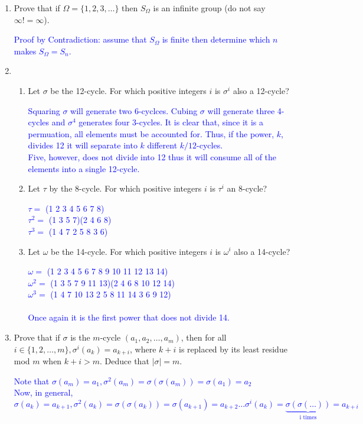 \documentclass[10pt,a4paper]{report}
\newcommand{\BLUE}[1]{\textcolor{blue}{#1}}
\begin{document}
\begin{enumerate}
\item Prove that if $\Omega=\{1,2,3,\dots\}$ then $S_\Omega$ is an infinite group (do not say $\infty!=\infty$).

\BLUE{Proof by Contradiction: assume that $S_\Omega$ is finite then determine which $n$ makes $S_\Omega=S_n$.}

\item \begin{enumerate}
	\item Let $\sigma$ be the 12-cycle.  For which positive integers $i$ is $\sigma^i$ also a 12-cycle?
	
	\BLUE{Squaring $\sigma$ will generate two 6-cyclces.  Cubing $\sigma$ will generate three 4-cycles and $\sigma^4$ generates four 3-cycles.  It is clear that, since it is a permuation, all elements must be accounted for.  Thus, if the power, $k$, divides 12 it will separate into $k$ different $k/12$-cycles.\\
	Five, however, does not divide into 12 thus it will consume all of the elements into a single 12-cycle.
	}
	
	\item Let $\tau$ by the 8-cycle. For which positive integers $i$ is $\tau^i$ an 8-cycle?
	
	\BLUE{
	$\tau =$ (1 2 3 4 5 6 7 8)\\
	$\tau^2 = $ (1 3 5 7)(2 4 6 8) \\
	$\tau^3 = $ (1 4 7 2 5 8 3 6)
	}
	
	\item Let $\omega$ be the 14-cycle.  For which positive integers $i$ is $\omega^i$ also a 14-cycle?
	
	\BLUE{
	$\omega = $ (1 2 3 4 5 6 7 8 9 10 11 12 13 14)\\
	$\omega^2 = $ (1 3 5 7 9 11 13)(2 4 6 8 10 12 14) \\
	$\omega^3 = $ (1 4 7 10 13 2 5 8 11 14 3 6 9 12) \\
	\\Once again it is the first power that does not divide 14.
	}
\end{enumerate}

\item Prove that if $\sigma$ is the $m$-cycle $(a_1, a_2, \dots, a_m)$, then for all $i \in \{1,2,\dots,m\}, \sigma^i(a_k)=a_{k+i}$, where $k+i$ is replaced by its least residue mod $m$ when $k+i>m$.  Deduce that $|\sigma|=m$.

\BLUE{Note that $\sigma(a_m) = a_1, \sigma^2(a_m)=\sigma(\sigma(a_m))=\sigma(a_1) = a_2$\\
Now, in general,  $\sigma(a_k) = a_{k+1}, \sigma^2(a_k)=\sigma(\sigma(a_k))=\sigma(a_{k+1}) = a_{k+2} \dots \sigma^i(a_k) = \underbrace{\sigma(\sigma(\dots))}_\text{i times} = a_{k+i}$
}


\end{enumerate}
\end{document}
